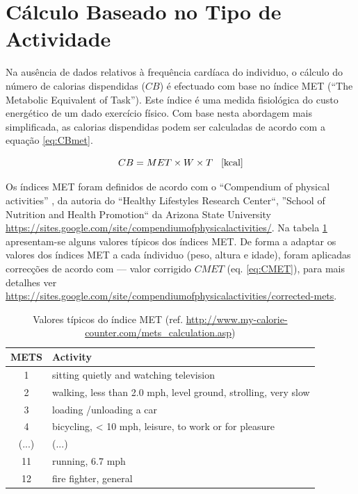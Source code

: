 \documentclass[a4paper,10pt]{report}
\begin{document}
\section{Cálculo Baseado no Tipo de Actividade}
\label{sec:caloriasMet}
Na ausência de dados relativos à frequência cardíaca do individuo, o cálculo do número de calorias dispendidas ($CB$) é efectuado com base 
no índice MET (``The Metabolic Equivalent of Task''). Este índice é uma medida fisiológica do custo energético de um dado exercício físico.
Com base nesta abordagem mais simplificada, as calorias dispendidas podem ser calculadas de acordo com a equação \ref{eq:CBmet}.

\begin{equation} \label{eq:CBmet} 
CB = MET \times W \times T \text{\hspace*{0.3cm}[kcal]}
\end{equation}

Os índices MET foram definidos de acordo com o ``Compendium of physical activities'' \cite{compendium}, da autoria do ``Healthy Lifestyles Research Center``, 
''School of Nutrition and Health Promotion`` da Arizona State University \url{https://sites.google.com/site/compendiumofphysicalactivities/}.
Na tabela \ref{tab:met} apresentam-se alguns valores típicos dos índices MET. 
De forma a adaptar os valores dos índices MET a cada índividuo (peso, altura e idade), foram aplicadas correcções de acordo com \cite{NCB} --- 
valor corrigido $CMET$ (eq. \ref{eq:CMET}), para mais detalhes ver \url{https://sites.google.com/site/compendiumofphysicalactivities/corrected-mets}.

\begin{table}
\caption {Valores típicos do índice MET (ref. \url{http://www.my-calorie-counter.com/mets_calculation.asp})} 
\label{tab:met}
\begin{center}
  \begin{tabular}{| c | l |}
    \hline                       
    METS & Activity\\
    \hline  
    \hline  
    1 & sitting quietly and watching television \\
    \hline  
    2 & walking, less than 2.0 mph, level ground, strolling, very slow \\
    \hline  
    3 & loading /unloading a car\\
    \hline  
    4 & bicycling, < 10 mph, leisure, to work or for pleasure\\
    \hline  
    (...) & (...)\\
    \hline  
    11 & running, 6.7 mph\\
    \hline  
    12 & fire fighter, general\\
    \hline  
  \end{tabular}
\end{center}
\end{table}
\end{document}
